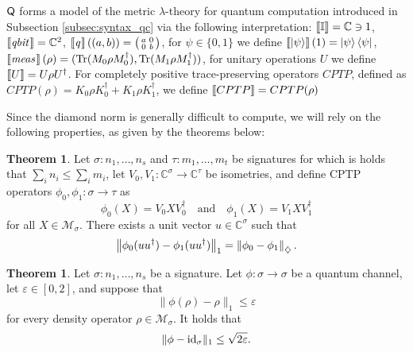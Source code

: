 \documentclass[10pt,a4paper]{amsart}
\theoremstyle{definition}
\theoremstyle{definition}
\theoremstyle{definition}
\theoremstyle{definition}
\theoremstyle{definition}
\theoremstyle{definition}
\newtheorem{theorem}[definition]{Theorem}
\begin{document}
$\mathsf{Q}$ forms a model of the metric $\lambda$-theory for quantum computation introduced in  Subsection \ref{subsec:syntax_qc} via the following interpretation: $\left \llbracket \mathbb{I} \right \rrbracket= \mathbb{C} \ni  1$, 
$\left \llbracket \emph{qbit} \hspace{1pt} \right \rrbracket= \mathbb{C}^2$, 
$\left \llbracket \emph{q} \hspace{1pt} \right \rrbracket((a,b)) = \big(\begin{smallmatrix}
  a & 0\\
  0 & b
\end{smallmatrix}\big)$, 
for $\psi \in \{0, 1\}$ we define $\left \llbracket \ket{\psi} \right \rrbracket (1)= \ket{\psi} \bra{\psi}$,
$\left \llbracket \emph{meas} \hspace{1pt} \right \rrbracket (\rho)= (\text{Tr} (M_{0} \rho M_{0}^{\dag}), \text{Tr} (M_{1} \rho M_{1}^{\dag}))$, 
for unitary operations $U$ we define $\left \llbracket U \right \rrbracket= U \rho U^{\dag}$. 
For completely positive trace-preserving operators $CPTP$, defined as $CPTP (\rho) = K_0 \rho K_0^{\dag} +  K_1 \rho K_1^{\dag}$, we define  $\left \llbracket CPTP \right \rrbracket= CPTP (\rho)$ 

Since the diamond norm is generally difficult to compute, we will rely on the following properties, as given by the theorems below:

\begin{theorem} \cite[Theorem 3.55]{watrous2018theory} \label{theorem:diamond_iso}
  Let $\sigma: n_1, \ldots, n_s$ and  $\tau: m_1, \ldots, m_t$  be signatures for which is holds that $ \sum_i n_i \leq \sum_i m_i$, let $V_0,V_1: \mathbb{C}^{\sigma} \to \mathbb{C}^{\tau}$ be isometries, and define CPTP operators $\phi_0,\phi_1: \sigma \to \tau$ as
\[
\phi_0(X) = V_0XV_0^\dag \quad \text{and} \quad \phi_1(X) = V_1XV_1^\dag
\]
for all $X \in \mathcal{M}_\sigma$. There exists a unit vector $u \in \mathbb{C}^{\sigma} $ such that
\[
\left\lVert \phi_0(uu^\dag) - \phi_1(uu^\dag) \right\rVert_{1} = \left\lVert \phi_0 - \phi_1 \right\rVert_{\diamondsuit}.
\]
\end{theorem}

\begin{theorem} \cite[Theorem 3.56]{watrous2018theory} \label{theorem:diamond_cptp_id}
  Let $\sigma: n_1, \ldots, n_s$ be a signature. Let $\phi: \sigma \to \sigma $ be a quantum channel, let $\varepsilon \in [0,2]$, and suppose that
    \[
    \|\phi(\rho) - \rho\|_1 \leq \varepsilon
    \]
    for every density operator $\rho \in \mathcal{M}_\sigma$. It holds that
    \[
    \|\phi - \mathrm{id}_{\sigma}\|_1 \leq \sqrt{2\varepsilon}.
    \]
\end{theorem}
\end{document}
